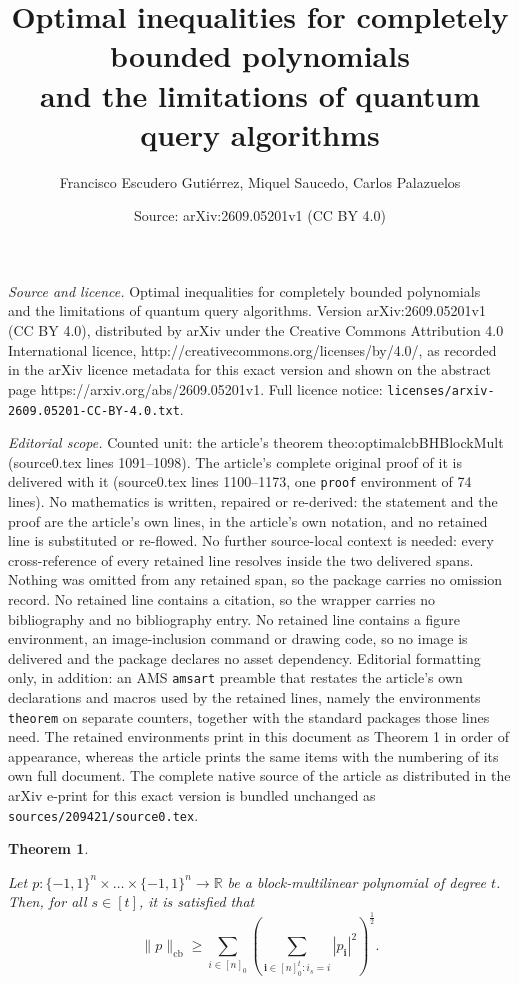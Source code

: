 \documentclass[10pt,a4paper]{amsart}
\title{Optimal inequalities for completely bounded polynomials\\ and the limitations of quantum query algorithms}
\author{Francisco Escudero Guti\'errez, Miquel Saucedo, Carlos Palazuelos}
\date{Source: arXiv:2609.05201v1 (CC BY 4.0)}
\newtheorem{theorem}{Theorem}
\newcommand{\R}{\mathbb{R}} %
\DeclareMathOperator{\cb}{cb}
\newcommand{\ind}[1]{\mathbf{#1}}
\newcommand{\norm}[1]{\|#1\|}
\begin{document}
\maketitle

\noindent\emph{Source and licence.} Optimal inequalities for completely bounded polynomials\\ and the limitations of quantum query algorithms. Version arXiv:2609.05201v1 (CC BY 4.0), distributed by arXiv under the Creative Commons Attribution 4.0 International licence, http://creativecommons.org/licenses/by/4.0/, as recorded in the arXiv licence metadata for this exact version and shown on the abstract page https://arxiv.org/abs/2609.05201v1. Full licence notice: \texttt{licenses/arxiv-2609.05201-CC-BY-4.0.txt}.\par\smallskip

\noindent\textit{Editorial scope.} Counted unit: the article's theorem theo:optimalcbBHBlockMult (source0.tex lines 1091--1098). The article's complete original proof of it is delivered with it (source0.tex lines 1100--1173, one \texttt{proof} environment of 74 lines). No mathematics is written, repaired or re-derived: the statement and the proof are the article's own lines, in the article's own notation, and no retained line is substituted or re-flowed.  No further source-local context is needed: every cross-reference of every retained line resolves inside the two delivered spans.  Nothing was omitted from any retained span, so the package carries no omission record.  No retained line contains a citation, so the wrapper carries no bibliography and no bibliography entry.  No retained line contains a figure environment, an image-inclusion command or drawing code, so no image is delivered and the package declares no asset dependency.  Editorial formatting only, in addition: an AMS \texttt{amsart} preamble that restates the article's own declarations and macros used by the retained lines, namely the environments \texttt{theorem} on separate counters, together with the standard packages those lines need.  The retained environments print in this document as Theorem 1 in order of appearance, whereas the article prints the same items with the numbering of its own full document.  The complete native source of the article as distributed in the arXiv e-print for this exact version is bundled unchanged as \texttt{sources/209421/source0.tex}.
\begin{theorem}\label{theo:optimalcbBHBlockMult}

Let $p:\{-1,1\}^n\times\dots\times\{-1,1\}^n\to\R$ be a block-multilinear polynomial of degree $t$. Then, for all $s\in [t]$, it is satisfied that  
\begin{equation}
\label{eq:optimalcbBHBlockMult}
    \norm{p}_{\cb}\geq   \sum_{i\in [n]_0} \left(\sum_{\ind  i\in [n]^t_0:i_s=i} |p_{\ind i}|^2\right)^\frac12. 
\end{equation}  
\end{theorem}
\end{document}

